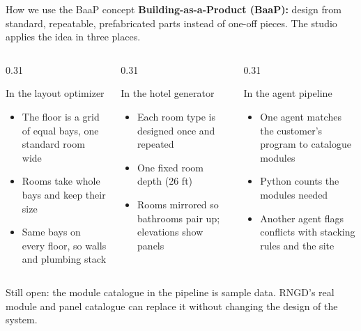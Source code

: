 \documentclass[9pt,aspectratio=169]{beamer}
\begin{document}
\begin{frame}{How we use the BaaP concept}
\textbf{Building-as-a-Product (BaaP):} design from standard, repeatable, prefabricated parts instead of one-off pieces. The studio applies the idea in three places.
\begin{columns}[T]
\begin{column}{0.31\textwidth}
\begin{block}{In the layout optimizer}
\begin{itemize}
\item The floor is a grid of equal bays, one standard room wide
\item Rooms take whole bays and keep their size
\item Same bays on every floor, so walls and plumbing stack
\end{itemize}
\end{block}
\end{column}
\begin{column}{0.31\textwidth}
\begin{block}{In the hotel generator}
\begin{itemize}
\item Each room type is designed once and repeated
\item One fixed room depth (26 ft)
\item Rooms mirrored so bathrooms pair up; elevations show panels
\end{itemize}
\end{block}
\end{column}
\begin{column}{0.31\textwidth}
\begin{block}{In the agent pipeline}
\begin{itemize}
\item One agent matches the customer's program to catalogue modules
\item Python counts the modules needed
\item Another agent flags conflicts with stacking rules and the site
\end{itemize}
\end{block}
\end{column}
\end{columns}
\vspace{0.2cm}
{\small\color{muted} Still open: the module catalogue in the pipeline is sample data. RNGD's real module and panel catalogue can replace it without changing the design of the system.}
\end{frame}
\end{document}
